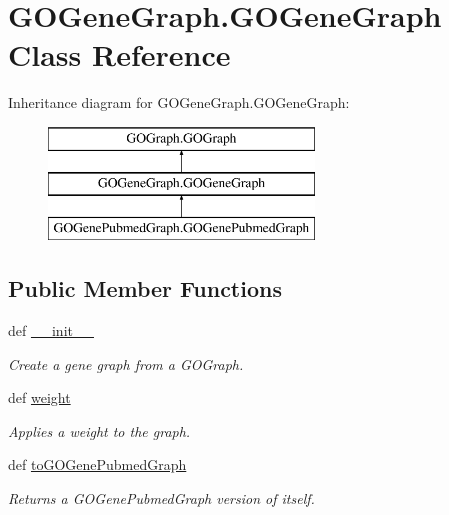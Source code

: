 \hypertarget{class_g_o_gene_graph_1_1_g_o_gene_graph}{
\section{GOGeneGraph.GOGeneGraph Class Reference}
\label{class_g_o_gene_graph_1_1_g_o_gene_graph}
}
Inheritance diagram for GOGeneGraph.GOGeneGraph:\begin{figure}[H]
\begin{center}
\leavevmode
\includegraphics[height=3.000000cm]{class_g_o_gene_graph_1_1_g_o_gene_graph}
\end{center}
\end{figure}
\subsection*{Public Member Functions}
\begin{DoxyCompactItemize}
\item 
def \hyperlink{class_g_o_gene_graph_1_1_g_o_gene_graph_a37f579f2fd7c2e8f0e52345e5c94233f}{\_\-\_\-init\_\-\_\-}
\begin{DoxyCompactList}\small\item\em Create a gene graph from a GOGraph. \item\end{DoxyCompactList}\item 
\hypertarget{class_g_o_gene_graph_1_1_g_o_gene_graph_a276c7e223374b8c22417e195afacffed}{
def \hyperlink{class_g_o_gene_graph_1_1_g_o_gene_graph_a276c7e223374b8c22417e195afacffed}{weight}}
\label{class_g_o_gene_graph_1_1_g_o_gene_graph_a276c7e223374b8c22417e195afacffed}

\begin{DoxyCompactList}\small\item\em Applies a weight to the graph. \item\end{DoxyCompactList}\item 
def \hyperlink{class_g_o_gene_graph_1_1_g_o_gene_graph_a5f437c2ab06eacde21831786192c4a4e}{toGOGenePubmedGraph}
\begin{DoxyCompactList}\small\item\em Returns a GOGenePubmedGraph version of itself. \item\end{DoxyCompactList}\end{DoxyCompactItemize}


